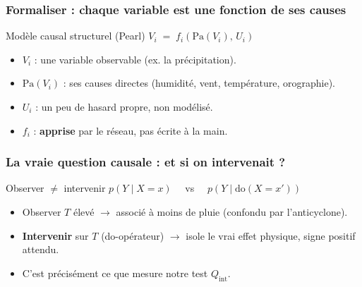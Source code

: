 \documentclass[11pt]{beamer}
\begin{document}
\begin{frame}
\frametitle{Formaliser : chaque variable est une fonction de ses causes}
\begin{block}{Modèle causal structurel (Pearl)}
\centering
$V_i \;=\; f_i\!\left(\mathrm{Pa}(V_i),\, U_i\right)$
\end{block}
\begin{itemize}
  \item $V_i$ : une variable observable (ex. la précipitation).
  \item $\mathrm{Pa}(V_i)$ : ses causes directes (humidité, vent, température, orographie).
  \item $U_i$ : un peu de hasard propre, non modélisé.
  \item $f_i$ : \textbf{apprise} par le réseau, pas écrite à la main.
\end{itemize}
\end{frame}

\begin{frame}
\frametitle{La vraie question causale : et si on intervenait ?}
\begin{block}{Observer $\neq$ intervenir}
\centering
$p(Y \mid X = x) \quad$ vs $\quad p(Y \mid \mathrm{do}(X = x'))$
\end{block}
\begin{itemize}
  \item Observer $T$ élevé $\to$ associé à moins de pluie (confondu par l'anticyclone).
  \item \textbf{Intervenir} sur $T$ (do-opérateur) $\to$ isole le vrai effet physique, signe positif attendu.
  \item C'est précisément ce que mesure notre test $Q_{\mathrm{int}}$.
\end{itemize}
\end{frame}
\end{document}
